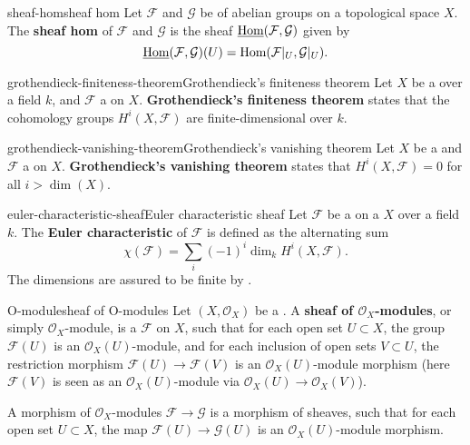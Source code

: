 \begin{topic}{sheaf-hom}{sheaf hom}
    Let $\mathcal{F}$ and $\mathcal{G}$ be  of abelian groups on a topological space $X$. The \textbf{sheaf hom} of $\mathcal{F}$ and $\mathcal{G}$ is the sheaf $\underline{\text{Hom}}(\mathcal{F}, \mathcal{G})$ given by
    \[ \underline{\text{Hom}}(\mathcal{F}, \mathcal{G})(U) = \text{Hom}(\mathcal{F}|_U, \mathcal{G}|_U) . \]
\end{topic}

\begin{topic}{grothendieck-finiteness-theorem}{Grothendieck's finiteness theorem}
    Let $X$ be a   over a field $k$, and $\mathcal{F}$ a  on $X$. \textbf{Grothendieck's finiteness theorem} states that the cohomology groups $H^i(X, \mathcal{F})$ are finite-dimensional over $k$.
\end{topic}

\begin{topic}{grothendieck-vanishing-theorem}{Grothendieck's vanishing theorem}
    Let $X$ be a   and $\mathcal{F}$ a  on $X$. \textbf{Grothendieck's vanishing theorem} states that $H^i(X, \mathcal{F}) = 0$ for all $i > \dim(X)$.
\end{topic}

\begin{topic}{euler-characteristic-sheaf}{Euler characteristic sheaf}
    Let $\mathcal{F}$ be a  on a  $X$  over a field $k$. The \textbf{Euler characteristic} of $\mathcal{F}$ is defined as the alternating sum
    \[ \chi(\mathcal{F}) = \sum_{i} (-1)^i \dim_k H^i(X, \mathcal{F}) . \]
    The dimensions are assured to be finite by .
\end{topic}

\begin{topic}{O-module}{sheaf of O-modules}
    Let $(X, \mathcal{O}_X)$ be a . A \textbf{sheaf of $\mathcal{O}_X$-modules}, or simply $\mathcal{O}_X$-module, is a  $\mathcal{F}$ on $X$, such that for each open set $U \subset X$, the group $\mathcal{F}(U)$ is an $\mathcal{O}_X(U)$-module, and for each inclusion of open sets $V \subset U$, the restriction morphism $\mathcal{F}(U) \to \mathcal{F}(V)$ is an $\mathcal{O}_X(U)$-module morphism (here $\mathcal{F}(V)$ is seen as an $\mathcal{O}_X(U)$-module via $\mathcal{O}_X(U) \to \mathcal{O}_X(V)$).
    
    A morphism of $\mathcal{O}_X$-modules $\mathcal{F} \to \mathcal{G}$ is a morphism of sheaves, such that for each open set $U \subset X$, the map $\mathcal{F}(U) \to \mathcal{G}(U)$ is an $\mathcal{O}_X(U)$-module morphism.
\end{topic}


